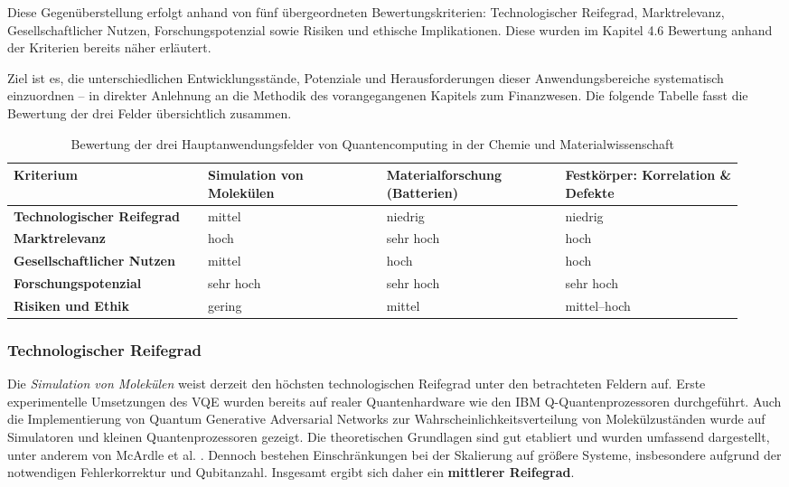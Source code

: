 Diese Gegenüberstellung erfolgt anhand von fünf übergeordneten Bewertungskriterien: Technologischer Reifegrad, Marktrelevanz, Gesellschaftlicher Nutzen, Forschungspotenzial sowie Risiken und ethische Implikationen. Diese wurden im Kapitel 4.6 Bewertung anhand der Kriterien bereits näher erläutert.

Ziel ist es, die unterschiedlichen Entwicklungsstände, Potenziale und Herausforderungen dieser Anwendungsbereiche systematisch einzuordnen – in direkter Anlehnung an die Methodik des vorangegangenen Kapitels zum Finanzwesen. Die folgende Tabelle fasst die Bewertung der drei Felder übersichtlich zusammen.

\begin{table}[h]
\centering
\begin{tabular}{|p{0.25\linewidth}|p{0.23\linewidth}|p{0.23\linewidth}|p{0.23\linewidth}|}
\hline
\textbf{Kriterium} & \textbf{Simulation von Molekülen} & \textbf{Materialforschung (Batterien)} & \textbf{Festkörper: Korrelation \& Defekte} \\
\hline
\textbf{Techno\-logischer Reife\-grad} & mittel & niedrig & niedrig \\
\hline
\textbf{Markt\-relevanz} & hoch & sehr hoch & hoch \\
\hline
\textbf{Gesell\-schaft\-licher Nutzen} & mittel & hoch & hoch \\
\hline
\textbf{Forschungs\-potenzial} & sehr hoch & sehr hoch & sehr hoch \\
\hline
\textbf{Risiken und Ethik} & gering & mittel & mittel--hoch \\
\hline
\end{tabular}
\caption{Bewertung der drei Hauptanwendungsfelder von Quantencomputing in der Chemie und Materialwissenschaft}
\label{tab:qc-chemie-bewertung}
\end{table}



\subsubsection{Technologischer Reifegrad}

Die \textit{Simulation von Molekülen} weist derzeit den höchsten technologischen Reifegrad unter den betrachteten Feldern auf. Erste experimentelle Umsetzungen des VQE wurden bereits auf realer Quantenhardware wie den IBM Q-Quantenprozessoren durchgeführt. \cite{kandala_hardware-efficient_2017} Auch die Implementierung von Quantum Generative Adversarial Networks zur Wahrscheinlichkeitsverteilung von Molekülzuständen wurde auf Simulatoren und kleinen Quantenprozessoren gezeigt. \cite{zoufal_quantum_2019} Die theoretischen Grundlagen sind gut etabliert und wurden umfassend dargestellt, unter anderem von McArdle et al. \cite{mcardle_quantum_2020}. Dennoch bestehen Einschränkungen bei der Skalierung auf größere Systeme, insbesondere aufgrund der notwendigen Fehlerkorrektur und Qubitanzahl. Insgesamt ergibt sich daher ein \textbf{mittlerer Reifegrad}.

